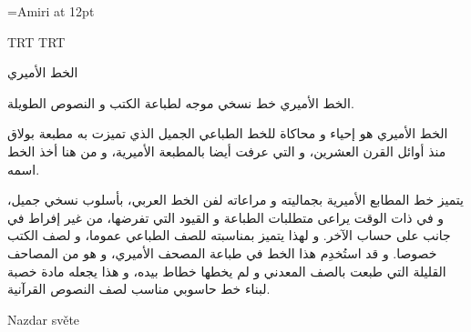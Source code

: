 \documentclass{article}
\begin{document}
\font\amiri={Amiri} at 12pt
\amiri
\startharfbuzz


\luatextextdir TRT
\luatexpardir TRT

الخط الأميري 

الخط الأميري خط نسخي موجه لطباعة الكتب و النصوص الطويلة.

الخط الأميري هو إحياء و محاكاة للخط الطباعي الجميل الذي تميزت به مطبعة بولاق منذ أوائل القرن العشرين، و التي عرفت أيضا بالمطبعة الأميرية، و من هنا أخذ الخط اسمه.

يتميز خط المطابع الأميرية بجماليته و مراعاته لفن الخط العربي، بأسلوب نسخي جميل، و في ذات الوقت يراعى متطلبات الطباعة و القيود التي تفرضها، من غير إفراط في جانب على حساب الآخر. و لهذا يتميز بمناسبته للصف الطباعي عموما، و لصف الكتب خصوصا. و قد استُخدِم هذا الخط في طباعة المصحف الأميري، و هو من المصاحف القليلة التي طبعت بالصف المعدني و لم يخطها خطاط بيده، و هذا يجعله مادة خصبة لبناء خط حاسوبي مناسب لصف النصوص القرآنية.

Nazdar světe
\end{document}
